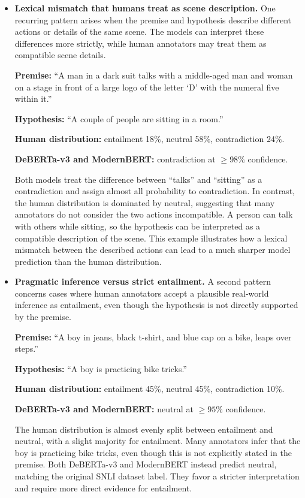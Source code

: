 \documentclass[11pt,a4paper]{article}
\begin{document}
\begin{itemize}[itemsep=0.5em, topsep=0.4em]

\item \textbf{Lexical mismatch that humans treat as scene description.}
One recurring pattern arises when the premise and hypothesis describe different actions or details of the same scene. The models can interpret these differences more strictly, while human annotators may treat them as compatible scene details.

\textbf{Premise:} ``A man in a dark suit talks with a middle-aged man and woman on a stage in front of a large logo of the letter `D' with the numeral five within it.''

\textbf{Hypothesis:} ``A couple of people are sitting in a room.''

\textbf{Human distribution:} entailment 18\%, neutral 58\%, contradiction 24\%.

\textbf{DeBERTa-v3 and ModernBERT:} contradiction at $\geq 98\%$ confidence.

Both models treat the difference between ``talks'' and ``sitting'' as a contradiction and assign almost all probability to contradiction. In contrast, the human distribution is dominated by neutral, suggesting that many annotators do not consider the two actions incompatible. A person can talk with others while sitting, so the hypothesis can be interpreted as a compatible description of the scene. This example illustrates how a lexical mismatch between the described actions can lead to a much sharper model prediction than the human distribution.

\item \textbf{Pragmatic inference versus strict entailment.}
A second pattern concerns cases where human annotators accept a plausible real-world inference as entailment, even though the hypothesis is not directly supported by the premise.

\textbf{Premise:} ``A boy in jeans, black t-shirt, and blue cap on a bike, leaps over steps.''

\textbf{Hypothesis:} ``A boy is practicing bike tricks.''

\textbf{Human distribution:} entailment 45\%, neutral 45\%, contradiction 10\%.

\textbf{DeBERTa-v3 and ModernBERT:} neutral at $\geq 95\%$ confidence.

The human distribution is almost evenly split between entailment and neutral, with a slight majority for entailment. Many annotators infer that the boy is practicing bike tricks, even though this is not explicitly stated in the premise. Both DeBERTa-v3 and ModernBERT instead predict neutral, matching the original SNLI dataset label. They favor a stricter interpretation and require more direct evidence for entailment.


\end{itemize}
\end{document}
